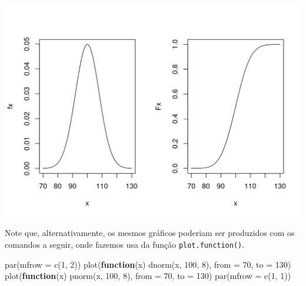 \documentclass[
  10pt,
  a4paper]{book}
\newenvironment{Shaded}{\begin{snugshade}}{\end{snugshade}}
\newcommand{\AttributeTok}[1]{\textcolor[rgb]{0.77,0.63,0.00}{#1}}
\newcommand{\ControlFlowTok}[1]{\textcolor[rgb]{0.13,0.29,0.53}{\textbf{#1}}}
\newcommand{\DecValTok}[1]{\textcolor[rgb]{0.00,0.00,0.81}{#1}}
\newcommand{\FunctionTok}[1]{\textcolor[rgb]{0.00,0.00,0.00}{#1}}
\newcommand{\NormalTok}[1]{#1}
\begin{document}
\begin{center}\includegraphics{figures/unnamed-chunk-343-1} \end{center}

Note que, alternativamente, os mesmos gráficos poderiam ser produzidos
com os comandos a seguir, onde fazemos usa da função \texttt{plot.function()}.

\begin{Shaded}
\begin{Highlighting}[]
\FunctionTok{par}\NormalTok{(}\AttributeTok{mfrow =} \FunctionTok{c}\NormalTok{(}\DecValTok{1}\NormalTok{, }\DecValTok{2}\NormalTok{))}
\FunctionTok{plot}\NormalTok{(}\ControlFlowTok{function}\NormalTok{(x) }\FunctionTok{dnorm}\NormalTok{(x, }\DecValTok{100}\NormalTok{, }\DecValTok{8}\NormalTok{), }\AttributeTok{from =} \DecValTok{70}\NormalTok{, }\AttributeTok{to =} \DecValTok{130}\NormalTok{)}
\FunctionTok{plot}\NormalTok{(}\ControlFlowTok{function}\NormalTok{(x) }\FunctionTok{pnorm}\NormalTok{(x, }\DecValTok{100}\NormalTok{, }\DecValTok{8}\NormalTok{), }\AttributeTok{from =} \DecValTok{70}\NormalTok{, }\AttributeTok{to =} \DecValTok{130}\NormalTok{)}
\FunctionTok{par}\NormalTok{(}\AttributeTok{mfrow =} \FunctionTok{c}\NormalTok{(}\DecValTok{1}\NormalTok{, }\DecValTok{1}\NormalTok{))}
\end{Highlighting}
\end{Shaded}
\end{document}
